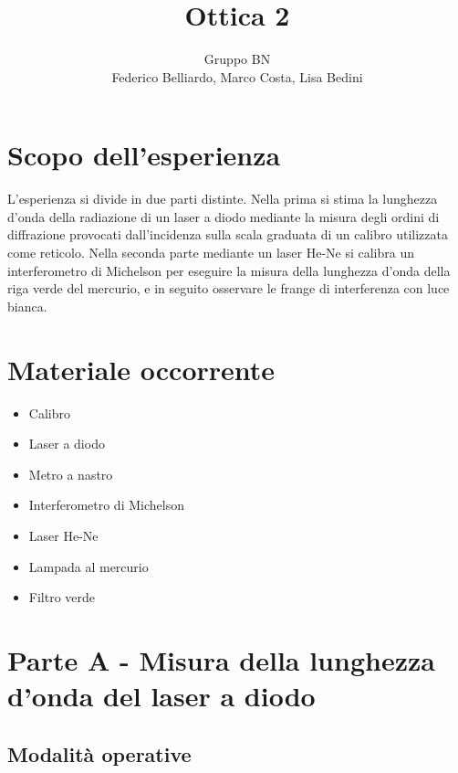 \documentclass[10pt,a4paper]{article}
\author{Gruppo BN \\ Federico Belliardo, Marco Costa, Lisa Bedini}
\title{Ottica 2}
\begin{document}
\maketitle
\section{Scopo dell'esperienza}
L'esperienza si divide in due parti distinte. Nella prima si stima la lunghezza d'onda della radiazione di un laser a diodo mediante la misura degli ordini di diffrazione provocati dall'incidenza sulla scala graduata di un calibro utilizzata come reticolo. Nella seconda parte mediante un laser He-Ne si calibra un interferometro di Michelson per eseguire la misura della lunghezza d'onda della riga verde del mercurio, e in seguito osservare le frange di interferenza con luce bianca.

\section{Materiale occorrente}
\begin{itemize}
\item Calibro
\item Laser a diodo
\item Metro a nastro
\item Interferometro di Michelson
\item Laser He-Ne
\item Lampada al mercurio
\item Filtro verde
\end{itemize}

\section{Parte A - Misura della lunghezza d'onda del laser a diodo}
\subsection{Modalità operative}
\end{document}
